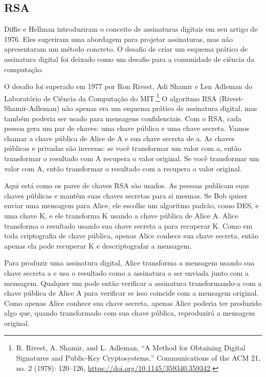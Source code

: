 \documentclass{book}
\begin{document}

\subsection{RSA}
\label{segredos:rsa}

Diffie e Hellman introduziram o conceito de assinaturas digitais em seu artigo de 1976. Eles sugeriram uma abordagem para projetar assinaturas, mas não apresentaram um método concreto. O desafio de criar um esquema prático de assinatura digital foi deixado como um desafio para a comunidade de ciência da computação.

O desafio foi superado em 1977 por Ron Rivest, Adi Shamir e Len Adleman do Laboratório de Ciência da Computação do MIT.\footnote{R. Rivest, A. Shamir, and L. Adleman, “A Method for Obtaining Digital Signatures and Public‐Key Cryptosystems,” Communications of the ACM 21, no. 2 (1978): 120–126, \url{https://doi.org/10.1145/359340.359342}.} O algoritmo RSA (Rivest-Shamir-Adleman) não apenas era um esquema prático de assinatura digital, mas também poderia ser usado para mensagens confidenciais. Com o RSA, cada pessoa gera um par de chaves: uma chave pública e uma chave secreta. Vamos chamar a chave pública de Alice de A e sua chave secreta de a. As chaves públicas e privadas são inversas: se você transformar um valor com a, então transformar o resultado com A recupera o valor original. Se você transformar um valor com A, então transformar o resultado com a recupera o valor original.

Aqui está como os pares de chaves RSA são usados. As pessoas publicam suas chaves públicas e mantêm suas chaves secretas para si mesmas. Se Bob quiser enviar uma mensagem para Alice, ele escolhe um algoritmo padrão, como DES, e uma chave K, e ele transforma K usando a chave pública de Alice A. Alice transforma o resultado usando sua chave secreta a para recuperar K. Como em toda criptografia de chave pública, apenas Alice conhece sua chave secreta, então apenas ela pode recuperar K e descriptografar a mensagem.

Para produzir uma assinatura digital, Alice transforma a mensagem usando sua chave secreta a e usa o resultado como a assinatura a ser enviada junto com a mensagem. Qualquer um pode então verificar a assinatura transformando-a com a chave pública de Alice A para verificar se isso coincide com a mensagem original. Como apenas Alice conhece sua chave secreta, apenas Alice poderia ter produzido algo que, quando transformado com sua chave pública, reproduzirá a mensagem original.
\end{document}
